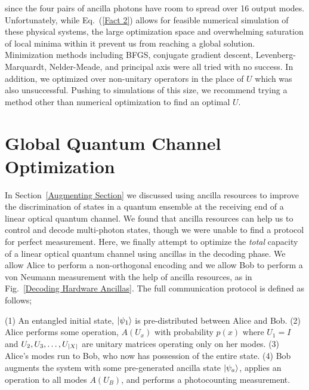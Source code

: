 \documentclass[aps,pra,twocolumn,showpacs,superscriptaddress,floatfix,10pt]{revtex4}
\begin{document}
since the four pairs of ancilla photons have room to spread over 16 output modes. 
\newline
\newline
Unfortunately, while Eq.~(\ref{Fact 2}) allows for feasible numerical simulation of these physical systems, the large optimization space and overwhelming saturation of local minima within it prevent us from reaching a global solution. Minimization methods including BFGS, conjugate gradient descent, Levenberg-Marquardt, Nelder-Meade, and principal axis were all tried with no success. In addition, we optimized over non-unitary operators in the place of $U$ which was also unsuccessful. Pushing to simulations of this size, we recommend trying a method other than numerical optimization to find an optimal $U$.
\section{Global Quantum Channel Optimization}
In Section~\ref{Augmenting Section} we discussed using ancilla resources to improve the discrimination of states in a quantum ensemble at the receiving end of a linear optical quantum channel. We found that ancilla resources can help us to control and decode multi-photon states, though we were unable to find a protocol for perfect measurement.  Here, we finally attempt to optimize the \textit{total} capacity of a linear optical quantum channel using ancillas in the decoding phase. We allow Alice to perform a non-orthogonal encoding and we allow Bob to perform a von Neumann measurement with the help of ancilla resources, as in Fig.~\ref{Decoding Hardware Ancillas}. The full communication protocol is defined as follows;
\newline
\begin{center}
	\begin{minipage}{20em}
		(1) An entangled initial state, $\ket{\psi_1}$ is pre-distributed between Alice and Bob.
		\newline
		\newline
		(2) Alice performs some operation, $A(U_x)$ with probability $p(x)$ where $U_1 = I$ and $U_2,U_3, \dots, U_{\abs{X}}$ are unitary matrices operating only on her modes.
		\newline
		\newline
		(3) Alice's modes run to Bob, who now has possession of the entire state.
		\newline
		\newline
		(4) Bob augments the system with some pre-generated ancilla state $\ket{\psi_a}$, applies an operation to all modes $A(U_B)$, and performs a photocounting measurement.
	\end{minipage}
\end{center}
\end{document}
